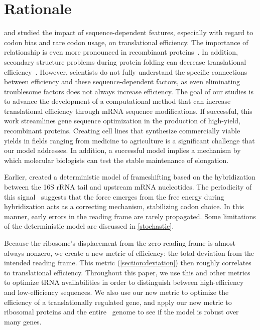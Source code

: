 \documentclass[12pt]{article}
\begin{document}
\section{Rationale}
\citet{kozak05} and \citet{kane95} studied the impact
of sequence-dependent features, especially with regard to codon bias 
and rare codon usage, on translational efficiency.  The importance of 
relationship is even more pronounced in recombinant 
proteins~\cite{sorensen05}.  In addition, secondary structure problems 
during protein folding can decrease translational 
efficiency~\cite{kozak05}.  However, scientists do not fully
understand the specific connections between efficiency and these
sequence-dependent factors, as even eliminating troublesome factors
does not always increase efficiency. The goal of our studies is to
advance the development of a computational method that can increase
translational efficiency through mRNA sequence modifications. If
successful, this work streamlines gene sequence optimization in the
production of high-yield, recombinant proteins. Creating cell lines
that synthesize commercially viable yields in fields ranging from
medicine to agriculture is a significant challenge that our model
addresses. In addition, a successful model implies a mechanism by
which molecular biologists can test the stable maintenance of
elongation.

Earlier, \citet{lalit:jbsb} created a deterministic model of
frameshifting based on the hybridization between the 16S rRNA tail and
upstream mRNA nucleotides.  The periodicity of this
signal~\cite{lalit:jbsb} suggests that the force emerges from the free
energy during hybridization acts as a correcting mechanism,
stabilizing codon choice.  In this manner, early errors in the reading
frame are rarely propagated.  Some limitations of the deterministic 
model are discussed in \autoref{stochastic}.

Because the ribosome's displacement from the zero reading frame is
almost always nonzero, we create a new metric of efficiency: the total 
deviation from the intended reading frame.  This metric
(\autoref{section:deviation}) then roughly correlates to translational
efficiency.  Throughout this paper, we use this and other metrics to
optimize tRNA availabilities in order to distinguish between
high-efficiency and low-efficiency sequences. We also use our new
metric to optimize the efficiency of a translationally regulated gene, 
and apply our new metric to ribosomal proteins and the entire \ecoli\ 
genome to see if the model is robust over many genes.
\end{document}
